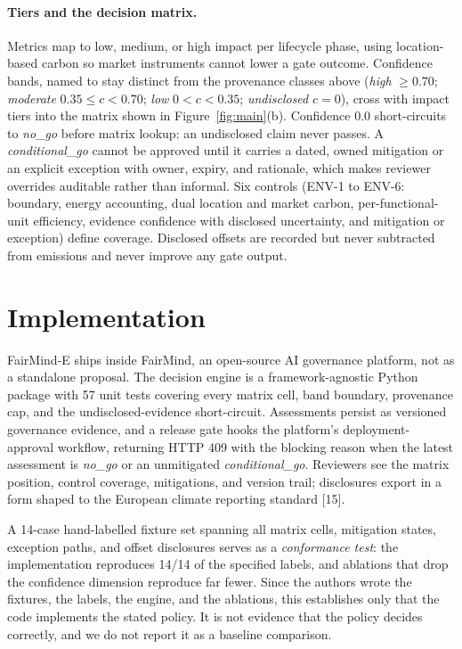 \documentclass{article}
\newcommand{\sysname}{FairMind-E}
\newcommand{\platname}{FairMind, an open-source AI governance platform}
\begin{document}
\paragraph{Tiers and the decision matrix.} Metrics map to low, medium, or high
impact per lifecycle phase, using location-based carbon so market instruments
cannot lower a gate outcome. Confidence bands, named to stay distinct from the
provenance classes above (\emph{high} $\geq 0.70$; \emph{moderate}
$0.35 \leq c < 0.70$; \emph{low} $0 < c < 0.35$; \emph{undisclosed} $c = 0$),
cross with impact tiers into the matrix shown in Figure~\ref{fig:main}(b). Confidence 0.0 short-circuits to \emph{no\_go} before
matrix lookup: an undisclosed claim never passes. A \emph{conditional\_go}
cannot be approved until it carries a dated, owned mitigation or an explicit
exception with owner, expiry, and rationale, which makes reviewer overrides
auditable rather than informal. Six controls (ENV-1 to ENV-6: boundary, energy
accounting, dual location and market carbon, per-functional-unit efficiency,
evidence confidence with disclosed uncertainty, and mitigation or exception)
define coverage. Disclosed offsets are recorded but never subtracted from
emissions and never improve any gate output.

\section{Implementation}

\sysname{} ships inside \platname, not as a standalone proposal. The decision
engine is a framework-agnostic Python package with 57 unit tests covering every
matrix cell, band boundary, provenance cap, and the undisclosed-evidence
short-circuit. Assessments persist as versioned governance evidence, and a
release gate hooks the platform's deployment-approval workflow, returning HTTP
409 with the blocking reason when the latest assessment is \emph{no\_go} or an
unmitigated \emph{conditional\_go}. Reviewers see the matrix position, control
coverage, mitigations, and version trail; disclosures export in a form shaped
to the European climate reporting standard [15].

A 14-case hand-labelled fixture set spanning all matrix cells, mitigation
states, exception paths, and offset disclosures serves as a \emph{conformance
test}: the implementation reproduces 14/14 of the specified labels, and
ablations that drop the confidence dimension reproduce far fewer. Since the
authors wrote the fixtures, the labels, the engine, and the ablations, this
establishes only that the code implements the stated policy. It is not
evidence that the policy decides correctly, and we do not report it as a
baseline comparison.
\end{document}
